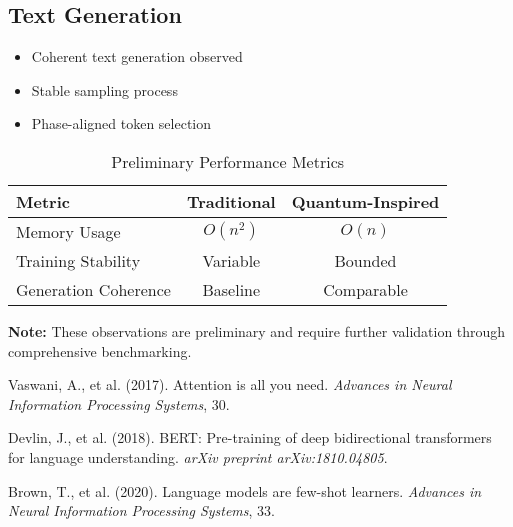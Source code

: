 \documentclass[twocolumn]{article}
\begin{document}
\subsection{Text Generation}
\begin{itemize}
    \item Coherent text generation observed
    \item Stable sampling process
    \item Phase-aligned token selection
\end{itemize}

\begin{table}[h]
\caption{Preliminary Performance Metrics}
\centering
\begin{tabular}{lcc}
\hline
\textbf{Metric} & \textbf{Traditional} & \textbf{Quantum-Inspired} \\
\hline
Memory Usage & $O(n^2)$ & $O(n)$ \\
Training Stability & Variable & Bounded \\
Generation Coherence & Baseline & Comparable \\
\hline
\end{tabular}
\end{table}

\textbf{Note:} These observations are preliminary and require further validation through comprehensive benchmarking.

\begin{thebibliography}{99}
 Vaswani, A., et al. (2017). Attention is all you need. \textit{Advances in Neural Information Processing Systems}, 30.

 Devlin, J., et al. (2018). BERT: Pre-training of deep bidirectional transformers for language understanding. \textit{arXiv preprint arXiv:1810.04805}.

 Brown, T., et al. (2020). Language models are few-shot learners. \textit{Advances in Neural Information Processing Systems}, 33.
\end{thebibliography}
\end{document}
